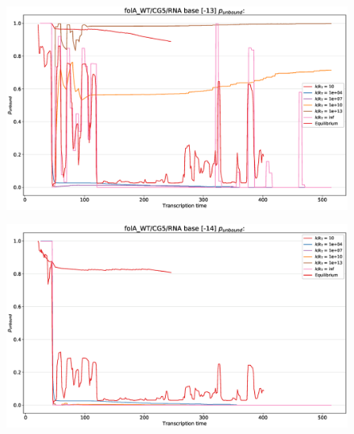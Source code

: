 \documentclass[11pt, a4paper]{article}
\begin{document}
\begin{figure}
\centering
\includegraphics[width=\linewidth]{p_unbound/RNA_p_unbound_base[-13]_k_tuning}
\caption{}
\label{fig:RNA_p_unbound_base[-13]_k_tuning}
\end{figure}
\begin{figure}
\centering
\includegraphics[width=\linewidth]{p_unbound/RNA_p_unbound_base[-14]_k_tuning}
\caption{}
\label{fig:RNA_p_unbound_base[-14]_k_tuning}
\end{figure}
\end{document}
